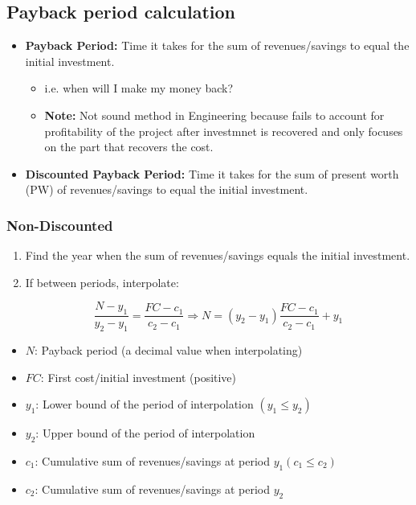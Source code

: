 \subsection{Payback period calculation}
\begin{terminology}
    \begin{itemize}

        \item \textbf{Payback Period:} Time it takes for the sum of revenues/savings to equal the initial investment.
        \begin{itemize}
            \item i.e. when will I make my money back?
            \item \textbf{Note:} Not sound method in Engineering because fails to account for profitability of the project after investmnet is recovered and only focuses on the part that recovers the cost. 
        \end{itemize}
        
        \item \textbf{Discounted Payback Period:} Time it takes for the sum of present worth (PW) of revenues/savings to equal the initial investment.
    \end{itemize}
\end{terminology}

\subsubsection{Non-Discounted}
    \begin{process}
        \begin{enumerate}
            \item Find the year when the sum of revenues/savings equals the initial investment.
            \item If between periods, interpolate:
            
            \begin{equation}
                \frac{N - y_1}{y_2 - y_1} = \frac{FC - c_1}{c_2 - c_1} \Rightarrow N = (y_2 - y_1) \frac{FC - c_1}{c_2 - c_1} + y_1
            \end{equation}
        \end{enumerate}

        \begin{itemize}
            \item $N$: Payback period (a decimal value when interpolating)
            \item $FC$: First cost/initial investment (positive)
            \item $y_1$: Lower bound of the period of interpolation $(y_1 \leq y_2)$
            \item $y_2$: Upper bound of the period of interpolation
            \item $c_1$: Cumulative sum of revenues/savings at period $y_1 (c_1 \leq c_2)$
            \item $c_2$: Cumulative sum of revenues/savings at period $y_2$
        \end{itemize}
    \end{process}

